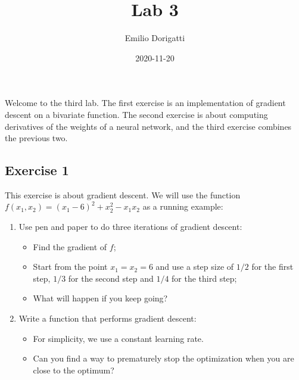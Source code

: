 \documentclass[
  a4paper,
]{article}
\title{Lab 3}
\author{Emilio Dorigatti}
\date{2020-11-20}
\providecommand{\tightlist}{%
  \setlength{\itemsep}{0pt}\setlength{\parskip}{0pt}}
\begin{document}
\maketitle

Welcome to the third lab. The first exercise is an implementation of
gradient descent on a bivariate function. The second exercise is about
computing derivatives of the weights of a neural network, and the third
exercise combines the previous two.

\hypertarget{exercise-1}{%
\subsection{Exercise 1}\label{exercise-1}}

This exercise is about gradient descent. We will use the function
\(f(x_1, x_2)=(x_1-6)^2+x_2^2-x_1x_2\) as a running example:

\begin{enumerate}
\def\labelenumi{\arabic{enumi}.}
\tightlist
\item
  Use pen and paper to do three iterations of gradient descent:

  \begin{itemize}
  \tightlist
  \item
    Find the gradient of \(f\);
  \item
    Start from the point \(x_1=x_2=6\) and use a step size of \(1/2\)
    for the first step, \(1/3\) for the second step and \(1/4\) for the
    third step;
  \item
    What will happen if you keep going?
  \end{itemize}
\item
  Write a function that performs gradient descent:

  \begin{itemize}
  \tightlist
  \item
    For simplicity, we use a constant learning rate.
  \item
    Can you find a way to prematurely stop the optimization when you are
    close to the optimum?
  \end{itemize}
\end{enumerate}
\end{document}
